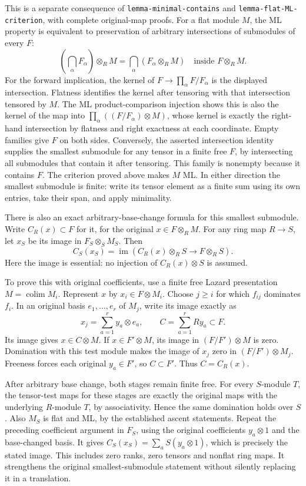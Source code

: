 This is a separate consequence of \texttt{lemma-minimal-contains} and \texttt{lemma-flat-ML-criterion}, with complete original-map proofs. For a flat module \(M\), the ML property is equivalent to preservation of arbitrary intersections of submodules of every \(F\): \[
\left(\bigcap_\alpha F_\alpha\right)\otimes_R M
=\bigcap_\alpha(F_\alpha\otimes_R M)
\quad\text{inside }F\otimes_RM.
\] For the forward implication, the kernel of \(F\to\prod_\alpha F/F_\alpha\) is the displayed intersection. Flatness identifies the kernel after tensoring with that intersection tensored by \(M\). The ML product-comparison injection shows this is also the kernel of the map into \(\prod_\alpha((F/F_\alpha)\otimes M)\), whose kernel is exactly the right-hand intersection by flatness and right exactness at each coordinate. Empty families give \(F\) on both sides. Conversely, the asserted intersection identity supplies the smallest submodule for any tensor in a finite free \(F\), by intersecting all submodules that contain it after tensoring. This family is nonempty because it contains \(F\). The criterion proved above makes \(M\) ML. In either direction the smallest submodule is finite: write its tensor element as a finite sum using its own entries, take their span, and apply minimality.

There is also an exact arbitrary-base-change formula for this smallest submodule. Write \(C_R(x)\subset F\) for it, for the original \(x\in F\otimes_RM\). For any ring map \(R\to S\), let \(x_S\) be its image in \(F_S\otimes_S M_S\). Then \[
C_S(x_S)=\operatorname{im}(C_R(x)\otimes_RS\longrightarrow F\otimes_RS).
\] Here the image is essential: no injection of \(C_R(x)\otimes S\) is assumed.

To prove this with original coefficients, use a finite free Lazard presentation \(M=\operatorname{colim}M_i\). Represent \(x\) by \(x_i\in F\otimes M_i\). Choose \(j\geq i\) for which \(f_{ij}\) dominates \(f_i\). In an original basis \(e_1,\ldots,e_r\) of \(M_j\), write its image exactly as \[
x_j=\sum_{a=1}^r y_a\otimes e_a,
\qquad C=\sum_{a=1}^r Ry_a\subset F.
\] Its image gives \(x\in C\otimes M\). If \(x\in F'\otimes M\), its image in \((F/F')\otimes M\) is zero. Domination with this test module makes the image of \(x_j\) zero in \((F/F')\otimes M_j\). Freeness forces each original \(y_a\in F'\), so \(C\subset F'\). Thus \(C=C_R(x)\).

After arbitrary base change, both stages remain finite free. For every \(S\)-module \(T\), the tensor-test maps for these stages are exactly the original maps with the underlying \(R\)-module \(T\), by associativity. Hence the same domination holds over \(S\). Also \(M_S\) is flat and ML, by the established ascent statements. Repeat the preceding coefficient argument in \(F_S\), using the original coefficients \(y_a\otimes1\) and the base-changed basis. It gives \(C_S(x_S)=\sum_a S(y_a\otimes1)\), which is precisely the stated image. This includes zero ranks, zero tensors and nonflat ring maps. It strengthens the original smallest-submodule statement without silently replacing it in a translation.

